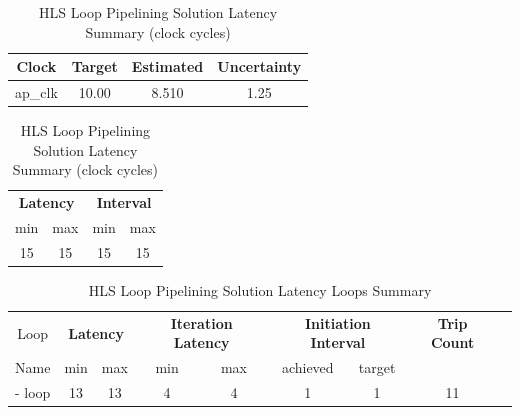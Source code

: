 \begin{table}[H]
    \centering
    \begin{minipage}[t]{0.45\linewidth}
        \centering
        \begin{tabular}{|c|c|c|c|}
            \hline
            \textbf{Clock} & \textbf{Target} & \textbf{Estimated} & \textbf{Uncertainty} \\
            \hline
            ap\_clk & 10.00 & 8.510 & 1.25 \\
            \hline
        \end{tabular}
        \caption{HLS Loop Pipelining Solution Timing Summary (ns)}
        \label{tab:hls-loop-pipelining-solution-timing-summary}
    \end{minipage}
    \hfill
    \begin{minipage}[t]{0.45\linewidth}
        \centering
        \begin{tabular}{|c|c|c|c|}
            \hline
            \multicolumn{2}{|c|}{\textbf{Latency}} & \multicolumn{2}{|c|}{\textbf{Interval}} \\
            min & max & min & max \\
            \hline
            15 & 15 & 15 & 15 \\
            \hline
        \end{tabular}
        \caption{HLS Loop Pipelining Solution Latency Summary (clock cycles)}
        \label{tab:hls-loop-pipelining-solution-latency-summary}
    \end{minipage}
\end{table}

\begin{table}[H]
    \centering
    \begin{tabular}{|c|c|c|c|c|c|c|c|c|}
        \hline
        \multicolumn{1}{|c|}{Loop} & \multicolumn{2}{|c|}{\textbf{Latency}} & \multicolumn{2}{c|}{\textbf{Iteration Latency}} & \multicolumn{2}{c|}{\textbf{Initiation Interval}} & \multicolumn{1}{c|}{\textbf{Trip Count}}  \\
        Name & min & max & min & max & achieved & target &  \\
        \hline
        - loop & 13 & 13 & 4 & 4 & 1 & 1 & 11 \\
        \hline
    \end{tabular}
    \caption{HLS Loop Pipelining Solution Latency Loops Summary }
    \label{tab:hls-loop-pipelining-solution-loop-summary}
\end{table}

